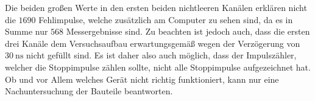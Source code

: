 Die beiden großen Werte in den ersten beiden nichtleeren Kanälen erklären nicht die $\num{1690}$ Fehlimpulse, welche zusätzlich am Computer zu sehen sind, da es in Summe nur $\num{568}$ Messergebnisse sind.
Zu beachten ist jedoch auch, dass die ersten drei Kanäle dem Versuchsaufbau erwartungsgemäß wegen der Verzögerung von $\SI{30}{\nano\second}$ nicht gefüllt sind.
Es ist daher also auch möglich, dass der Impulszähler, welcher die Stoppimpulse zählen sollte, nicht alle Stoppimpulse aufgezeichnet hat.
Ob und vor Allem welches Gerät nicht richtig funktioniert, kann nur eine Nachuntersuchung der Bauteile beantworten.
